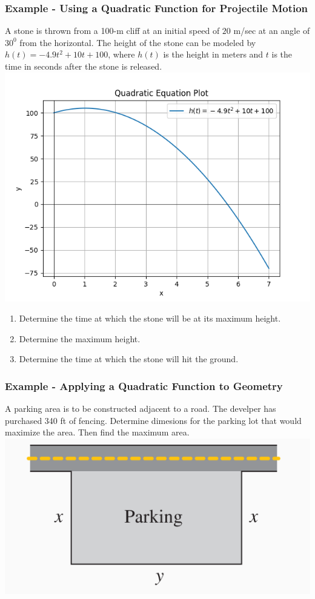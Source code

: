 \documentclass{beamer}
\begin{document}
\begin{frame}
    \frametitle{Example - Using a Quadratic Function for Projectile Motion}

    A stone is thrown from a 100-m cliff at an initial speed of \(20\) m/sec at an angle of \(30^0\) from the horizontal. The height of the stone can be modeled by \(h(t)=-4.9t^2 +10t +100\), where \(h(t)\) is the height in meters and \(t\) is the time in seconds after the stone is released. 
    \includegraphics[scale=0.2]{figs/Figure 4.png} 

    \begin{enumerate}
        \item Determine the time at which the stone will be at its maximum height.\pause
        \item Determine the maximum height. \pause
        \item Determine the time at which the stone will hit the ground. 
    \end{enumerate}

\end{frame}

\begin{frame}
    \frametitle{Example - Applying a Quadratic Function to Geometry}

    A parking area is to be constructed adjacent to a road. The develper has purchased 340 ft of fencing. Determine dimesions for the parking lot that would maximize the area. Then find the maximum area. \\
\includegraphics[scale=0.5]{figs/Figure 5.PNG}

\end{frame}
\end{document}
